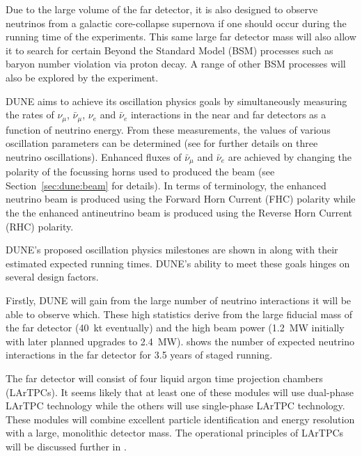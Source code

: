 Due to the large volume of the far detector, it is also designed to observe neutrinos from a galactic core-collapse supernova if one should occur during the running time of the experiments.
This same large far detector mass will also allow it to search for certain Beyond the Standard Model (BSM) processes such as baryon number violation via proton decay.
A range of other BSM processes will also be explored by the experiment.

DUNE aims to achieve its oscillation physics goals by simultaneously measuring the rates of $\nu_{\mu}$, $\bar{\nu}_{\mu}$, $\nu_{e}$ and $\bar{\nu}_{e}$ interactions in the near and far detectors as a function of neutrino energy.
From these measurements, the values of various oscillation parameters can be determined (see  for further details on three neutrino oscillations). 
Enhanced fluxes of $\bar{\nu}_{\mu}$ and $\bar{\nu}_{e}$ are achieved by changing the polarity of the focussing horns used to produced the beam (see Section~\ref{sec:dune:beam} for details).
In terms of terminology, the enhanced neutrino beam is produced using the Forward Horn Current (FHC) polarity while the the enhanced antineutrino beam is produced using the Reverse Horn Current (RHC) polarity.

DUNE's proposed oscillation physics milestones are shown in  along with their estimated expected running times.
DUNE's ability to meet these goals hinges on several design factors.

Firstly, DUNE will gain from the large number of neutrino interactions it will be able to observe which.
These high statistics derive from the large fiducial mass of the far detector (40~kt eventually) and the high beam power (1.2~MW initially with later planned upgrades to 2.4~MW).
 shows the number of expected neutrino interactions in the far detector for 3.5 years of staged running.

The far detector will consist of four liquid argon time projection chambers (LArTPCs).
It seems likely that at least one of these modules will use dual-phase LArTPC technology while the others will use single-phase LArTPC technology.
These modules will combine excellent particle identification and energy resolution with a large, monolithic detector mass. 
The operational principles of LArTPCs will be discussed further in .

